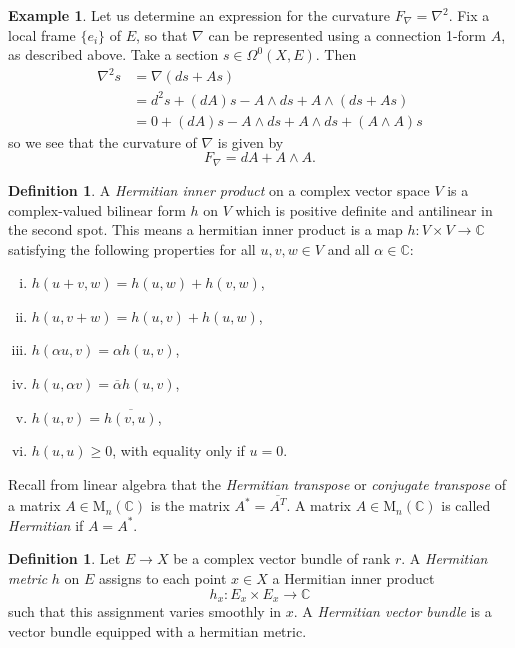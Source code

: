 \documentclass[10pt]{amsart}
\numberwithin{equation}{section}
\newcommand{\C}{\mathbb{C}}
\newcommand{\M}{\mathrm{M}}
\theoremstyle{plain}
\theoremstyle{definition}
\newtheorem{defn}[thm]{Definition}
\newtheorem{ex}[thm]{Example}
\theoremstyle{remark}
\begin{document}
\begin{ex}
    Let us determine an expression for the curvature $F_\nabla = \nabla^2$. Fix a local frame $\{e_i\}$ of $E$, so that $\nabla$ can be represented using a connection 1-form $A$, as described above. Take a section $s \in \Omega^0(X, E)$. Then 
    \begin{align*}
        \nabla^2 s &= \nabla(ds + A s) \\ 
                        &= d^2 s + (dA)s - A \wedge d s + A \wedge \left(d s + A s \right)\\ 
                        &= 0 + (dA)s - A \wedge d s + A \wedge d s + (A \wedge A)s
    \end{align*}
    so we see that the curvature of $\nabla$ is given by 
    \[F_\nabla = dA + A \wedge A.\]
\end{ex}

\begin{defn}
    A \emph{Hermitian inner product} on a complex vector space $V$ is a complex-valued bilinear form $h$ on $V$ which is positive definite and antilinear in the second spot. This means a hermitian inner product is a map $h: V \times V \to \C$ satisfying the following properties for all $u, v, w \in V$ and all $\alpha \in \C$:
    \begin{enumerate}[(i)]
        \item $h(u + v, w) = h(u, w) + h(v, w)$,
        \item $h(u, v + w) = h(u, v) + h(u, w)$,
        \item $h(\alpha u, v)=  \alpha h(u, v)$,
        \item $h(u, \alpha v) =  \overline{\alpha} h(u, v)$,
        \item $h(u, v) = \overline{h(v, u)}$,
        \item $h(u, u) \ge 0$, with equality only if $u = 0$.
    \end{enumerate}
\end{defn}

Recall from linear algebra that the \emph{Hermitian transpose} or \emph{conjugate transpose} of a matrix $A \in \M_n(\C)$ is the matrix $A^* = \overline{A^T}$. A matrix $A \in \M_n(\C)$ is called \emph{Hermitian} if $A = A^*$.

\begin{defn}
    Let $E \to X$ be a complex vector bundle of rank $r$. A \emph{Hermitian metric} $h$ on $E$ assigns to each point $x \in X$ a Hermitian inner product
    \[h_x: E_x \times E_x \to \C\]
    such that this assignment varies smoothly in $x$. A \emph{Hermitian vector bundle} is a vector bundle equipped with a hermitian metric.
\end{defn}
\end{document}
